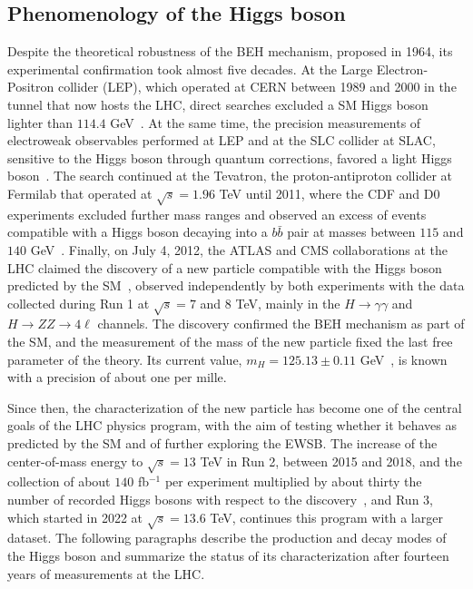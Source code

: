 \subsection{Phenomenology of the Higgs boson}
\label{subsec:H_phenomenology}
%
Despite the theoretical robustness of the BEH mechanism, proposed in 1964, its experimental confirmation took almost five decades. At the Large Electron-Positron collider (LEP), which operated at CERN between 1989 and 2000 in the tunnel that now hosts the LHC, direct searches excluded a SM Higgs boson lighter than $114.4$ GeV~\cite{LEPWorkingGroupforHiggsbosonsearches:2003ing}. At the same time, the precision measurements of electroweak observables performed at LEP and at the SLC collider at SLAC, sensitive to the Higgs boson through quantum corrections, favored a light Higgs boson~\cite{ALEPH:2005ab}. The search continued at the Tevatron, the proton-antiproton collider at Fermilab that operated at $\sqrt{s}=1.96$ TeV until 2011, where the CDF and D0 experiments excluded further mass ranges and observed an excess of events compatible with a Higgs boson decaying into a $b\bar{b}$ pair at masses between $115$ and $140$ GeV~\cite{CDF:2013kiv}. Finally, on July 4, 2012, the ATLAS and CMS collaborations at the LHC claimed the discovery of a new particle compatible with the Higgs boson predicted by the SM~\cite{ATLAS:2012yve,CMS:2012qbp,CMS:2013btf}, observed independently by both experiments with the data collected during Run 1 at $\sqrt{s}=7$ and $8$ TeV, mainly in the $H\to\gamma\gamma$ and $H\to ZZ\to 4\ell$ channels. The discovery confirmed the BEH mechanism as part of the SM, and the measurement of the mass of the new particle fixed the last free parameter of the theory. Its current value, $m_H = 125.13 \pm 0.11$ GeV~\cite{ParticleDataGroup:2026mpi}, is known with a precision of about one per mille.

Since then, the characterization of the new particle has become one of the central goals of the LHC physics program, with the aim of testing whether it behaves as predicted by the SM and of further exploring the EWSB. The increase of the center-of-mass energy to $\sqrt{s}=13$ TeV in Run 2, between 2015 and 2018, and the collection of about $140$ fb$^{-1}$ per experiment multiplied by about thirty the number of recorded Higgs bosons with respect to the discovery~\cite{CMS:2022dwd,ATLAS:2022vkf}, and Run 3, which started in 2022 at $\sqrt{s}=13.6$ TeV, continues this program with a larger dataset. The following paragraphs describe the production and decay modes of the Higgs boson and summarize the status of its characterization after fourteen years of measurements at the LHC.


